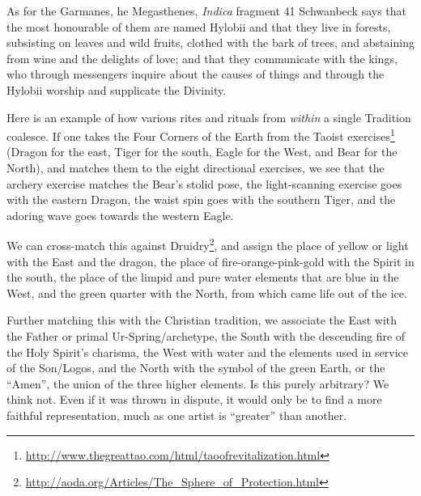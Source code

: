 \begin{quotex}
As for the Garmanes, he Megasthenes, \emph{Indica} fragment 41 Schwanbeck says that the most honourable of them are named Hylobii and that they live in forests, subsisting on leaves and wild fruits, clothed with the bark of trees, and abstaining from wine and the delights of love; and that they communicate with the kings, who through messengers inquire about the causes of things and through the Hylobii worship and supplicate the Divinity.
\end{quotex}


Here is an example of how various rites and rituals from \emph{within} a single Tradition coalesce. If one takes the Four Corners of the Earth from the Taoist exercises\footnote{\url{http://www.thegreattao.com/html/taoofrevitalization.html}} (Dragon for the east, Tiger for the south, Eagle for the West, and Bear for the North), and matches them to the eight directional exercises, we see that the archery exercise matches the Bear's stolid pose, the light-scanning exercise goes with the eastern Dragon, the waist spin goes with the southern Tiger, and the adoring wave goes towards the western Eagle.

We can cross-match this against Druidry\footnote{\url{http://aoda.org/Articles/The\_Sphere\_of\_Protection.html}}, and assign the place of yellow or light with the East and the dragon, the place of fire-orange-pink-gold with the Spirit in the south, the place of the limpid and pure water elements that are blue in the West, and the green quarter with the North, from which came life out of the ice.

Further matching this with the Christian tradition, we associate the East with the Father or primal Ur-Spring/archetype, the South with the descending fire of the Holy Spirit's charisma, the West with water and the elements used in service of the Son/Logos, and the North with the symbol of the green Earth, or the ``Amen'', the union of the three higher elements. Is this purely arbitrary? We think not. Even if it was thrown in dispute, it would only be to find a more faithful representation, much as one artist is ``greater'' than another.

